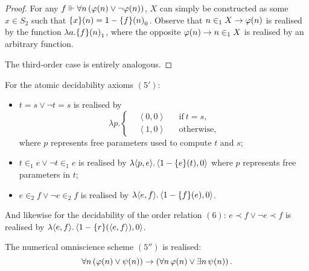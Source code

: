\documentclass[11pt]{article}
\theoremstyle{plain}
\theoremstyle{definition}
\newcommand{\tuple}[1]{\left\langle #1 \right\rangle}
\begin{document}
\begin{proof}
    For any $f \Vdash \forall n \left(\varphi\mleft(n\mright) \lor \neg \varphi\mleft(n\mright)\right)$, $X$ can simply be constructed as some $x \in S_2$ such that $\mleft\{x\mright\}\mleft(n\mright) = 1 - \mleft\{f\mright\}\mleft(n\mright)_0$. Observe that $n \in_1 X \rightarrow \varphi\mleft(n\mright)$ is realised by the function $\lambda a. \mleft\{f\mright\}\mleft(n\mright)_1$, where the opposite $\varphi\mleft(n\mright) \rightarrow n \in_1 X$ is realised by an arbitrary function.

    The third-order case is entirely analogous.
\end{proof}

For the atomic decidability axioms $\left(5'\right)$:
\begin{itemize}
    \item $t = s \lor \neg t = s$ is realised by
          \[\lambda p. \left\{\begin{aligned}
                   & \tuple{0, 0} &  & \text{if} \ t = s, \\
                   & \tuple{1, 0} &  & \text{otherwise},
              \end{aligned}\right.\]
          where $p$ represents free parameters used to compute $t$ and $s$;
    \item $t \in_1 e \lor \neg t \in_1 e$ is realised by $\lambda {\tuple{p, e}}. \tuple{1 - \mleft\{e\mright\}\mleft(t\mright), 0}$ where $p$ represents free parameters in $t$;
    \item $e \in_2 f \lor \neg e \in_2 f$ is realised by $\lambda {\tuple{e, f}}. \tuple{1 - \mleft\{f\mright\}\mleft(e\mright), 0}$.
\end{itemize}
And likewise for the decidability of the order relation $\left(6\right)$: $e \prec f \lor \neg e \prec f$ is realised by $\lambda {\tuple{e, f}}. \tuple{1 - \mleft\{r\mright\}\mleft(\tuple{e, f}\mright), 0}$.

\begin{proposition}
    The numerical omniscience scheme $\left(5''\right)$ is realised:
    \[\forall n \left(\varphi\mleft(n\mright) \lor \psi\mleft(n\mright)\right) \rightarrow \left(\forall n \, \varphi\mleft(n\mright) \lor \exists n \, \psi\mleft(n\mright)\right).\]
\end{proposition}
\end{document}
